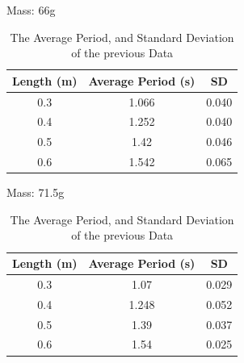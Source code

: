 \documentclass{article}
\begin{document}
\begin{table}[ht!]
    \begin{subtable}[t]{0.4\textwidth}
        \centering
        \caption{Mass: 66g}
        \begin{tabular}{c||c||c}
            \toprule
            Length (m) & Average Period (s) & SD \\
            \midrule
            0.3 & 1.066 & 0.040\\
            \hline
            0.4 & 1.252 & 0.040\\
            \hline
            0.5 & 1.42 & 0.046\\
            \hline
            0.6 & 1.542 & 0.065\\
            \bottomrule
        \end{tabular}
        \label{tab:mass_5.5g_1}
    \end{subtable}
    \hfill
    \begin{subtable}[t]{0.4\textwidth}
        \centering
        \caption{Mass: 71.5g}
        \begin{tabular}{c||c||c}
            \toprule
            Length (m) & Average Period (s) & SD \\
            \midrule
            0.3 & 1.07 & 0.029\\
            \hline
            0.4 & 1.248 & 0.052\\
            \hline
            0.5 & 1.39 & 0.037\\
            \hline
            0.6 & 1.54 & 0.025\\
            \bottomrule
        \end{tabular}
        \label{tab:mass_5.5g_1}
    \end{subtable}
    \caption{The Average Period, and Standard Deviation of the previous Data}
    \label{tab:data}
\end{table}
\end{document}
